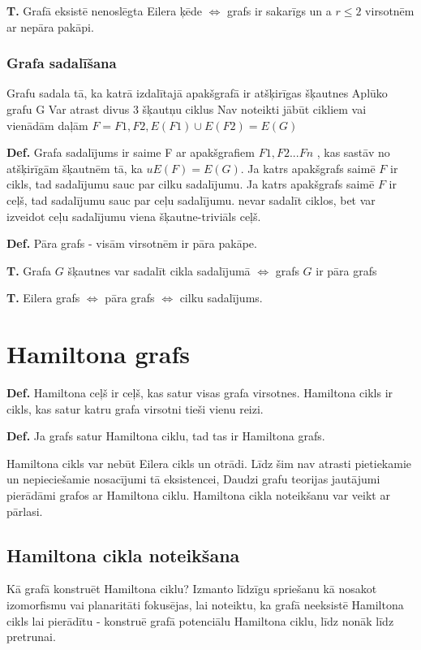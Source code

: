 \documentclass{article}
\begin{document}
\textbf{T. } Grafā eksistē nenoslēgta Eilera ķēde $⇔$ grafs ir sakarīgs un a $r \le 2$ virsotnēm ar nepāra pakāpi.

\subsubsection{Grafa sadalīšana}

Grafu sadala tā, ka katrā izdalītajā apakšgrafā ir atšķirīgas šķautnes Aplūko grafu G Var atrast divus 3 šķautņu ciklus Nav noteikti jābūt cikliem vai vienādām daļām $F = F1 , F2 , E (F1 ) \cup E (F2 ) = E (G )$

\textbf{Def.}  Grafa sadalījums ir saime F ar apakšgrafiem $F1 , F2 ...Fn$ , kas sastāv no atšķirīgām šķautnēm tā, ka $uE (F ) = E (G )$.  Ja katrs apakšgrafs saimē $F$ ir cikls, tad sadalījumu sauc par cilku sadalījumu. Ja katrs apakšgrafs saimē $F$ ir ceļš, tad sadalījumu sauc par ceļu sadalījumu.  nevar sadalīt ciklos, bet var izveidot ceļu sadalījumu viena šķautne-triviāls ceļš.

\textbf{Def.}  Pāra grafs - visām virsotnēm ir pāra pakāpe. 

\textbf{T. } Grafa $G$ šķautnes var sadalīt cikla sadalījumā $\Leftrightarrow$ grafs $G$ ir pāra grafs

\textbf{T. } Eilera grafs $\Leftrightarrow$ pāra grafs $\Leftrightarrow$ cilku sadalījums.

\section{Hamiltona grafs}

\textbf{Def.}  Hamiltona ceļš ir ceļš, kas satur visas grafa virsotnes.  Hamiltona cikls ir cikls, kas satur katru grafa virsotni tieši vienu reizi.

\textbf{Def.}  Ja grafs satur Hamiltona ciklu, tad tas ir Hamiltona grafs.

Hamiltona cikls var nebūt Eilera cikls un otrādi.  Līdz šim nav atrasti pietiekamie un nepieciešamie nosacījumi tā eksistencei, Daudzi grafu teorijas jautājumi pierādāmi grafos ar Hamiltona ciklu. Hamiltona cikla noteikšanu var veikt ar pārlasi.

\subsection{Hamiltona cikla noteikšana}
Kā grafā konstruēt Hamiltona ciklu? Izmanto līdzīgu spriešanu kā nosakot izomorfismu vai planaritāti fokusējas, lai noteiktu, ka grafā neeksistē Hamiltona cikls lai pierādītu - konstruē grafā potenciālu Hamiltona ciklu, līdz nonāk līdz pretrunai.
\end{document}
